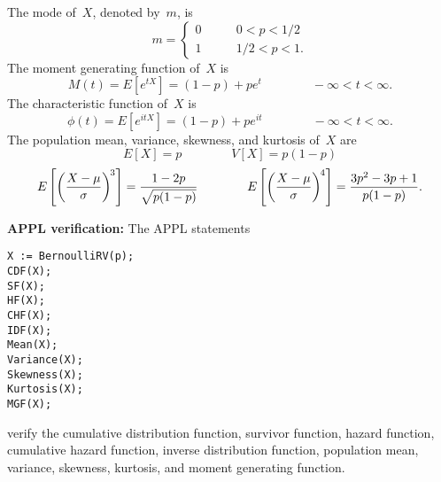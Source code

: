 \documentclass[12pt,fullpage]{article}
\begin{document}
The mode of~$X$, denoted by~$m$, is
$$
m = 
    \left\{
    \begin{array}{lll}
      0 & \qquad 0 < p < 1/2 \\ 
      1 & \qquad 1/2 < p < 1. 
    \end{array}
    \right.
$$
\noindent
The moment generating function of~$X$ is
$$
M(t) = E\left[ e ^ {tX} \right] = (1 - p) + p e ^ {t} \qquad \qquad -\infty < t < \infty.
$$
The characteristic function of~$X$ is
$$
\phi(t) = E\left[ e ^ {itX} \right] = (1 - p) + p e ^ {it} \qquad \qquad -\infty < t < \infty. 
$$
The population mean, variance, skewness, and kurtosis of~$X$ are
$$
E[X] = p \qquad \qquad V[X] = p (1 - p)
$$
$$
E\left[ \left( \frac{X - \mu}{\sigma} \right) ^{\kern -0.08 em 3}  \right] = \frac{1 - 2p}{\sqrt{p (1 - p)}} \qquad \qquad 
E\left[ \left( \frac{X - \mu}{\sigma} \right) ^{\kern -0.08 em 4} \right] = \frac{3p ^ 2 - 3p + 1}{p (1 - p)}.
$$


\newpage

\noindent
{\bf APPL verification:}
The APPL statements
\begin{verbatim}
X := BernoulliRV(p);
CDF(X);
SF(X);
HF(X);
CHF(X);
IDF(X);
Mean(X);
Variance(X);
Skewness(X);
Kurtosis(X);
MGF(X);
\end{verbatim}
verify the cumulative distribution function, survivor function, hazard function, cumulative hazard function, inverse distribution function, population mean, variance, skewness, kurtosis, and moment generating function.
\end{document}
